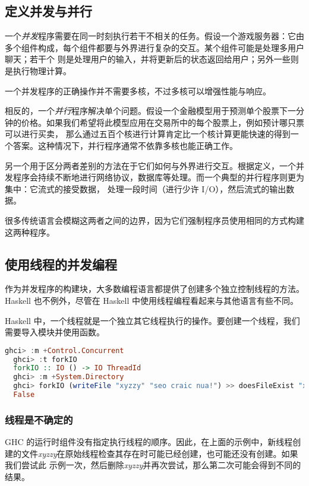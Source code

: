 \documentclass[./main.tex]{subfiles}
\begin{document}
\subsection*{定义并发与并行}

一个\textit{并发}程序需要在同一时刻执行若干不相关的任务。假设一个游戏服务器：它由多个组件构成，每个组件都要与外界进行复杂的交互。某个组件可能是处理多用户聊天；若干个
则是处理用户的输入，并将更新后的状态返回给用户；另外一些则是执行物理计算。

一个并发程序的正确操作并不需要多核，不过多核可以增强性能与响应。

相反的，一个\textit{并行}程序解决单个问题。假设一个金融模型用于预测单个股票下一分钟的价格。如果我们希望将此模型应用在交易所中的每个股票上，例如预计哪只票可以进行买卖，
那么通过五百个核进行计算肯定比一个核计算更能快速的得到一个答案。这种情况下，并行程序通常不依靠多核也能正确工作。

另一个用于区分两者差别的方法在于它们如何与外界进行交互。根据定义，一个并发程序会持续不断地进行网络协议，数据库等处理。而一个典型的并行程序则更为集中：它流式的接受数据，
处理一段时间（进行少许 I/O），然后流式的输出数据。

很多传统语言会模糊这两者之间的边界，因为它们强制程序员使用相同的方式构建这两种程序。

\subsection*{使用线程的并发编程}

作为并发程序的构建块，大多数编程语言都提供了创建多个独立控制线程的方法。Haskell 也不例外，尽管在 Haskell 中使用线程编程看起来与其他语言有些不同。

Haskell 中，一个线程就是一个独立其它线程执行的操作。要创建一个线程，我们需要导入模块并使用函数。

\begin{lstlisting}[language=Haskell]
  ghci> :m +Control.Concurrent
  ghci> :t forkIO
  forkIO :: IO () -> IO ThreadId
  ghci> :m +System.Directory
  ghci> forkIO (writeFile "xyzzy" "seo craic nua!") >> doesFileExist "xyzzy"
  False
\end{lstlisting}

\subsubsection*{线程是不确定的}

GHC 的运行时组件没有指定执行线程的顺序。因此，在上面的示例中，新线程创建的文件\textit{xyzzy}在原始线程检查其存在时可能已经创建，也可能还没有创建。如果我们尝试此
示例一次，然后删除\textit{xyzzy}并再次尝试，那么第二次可能会得到不同的结果。
\end{document}
